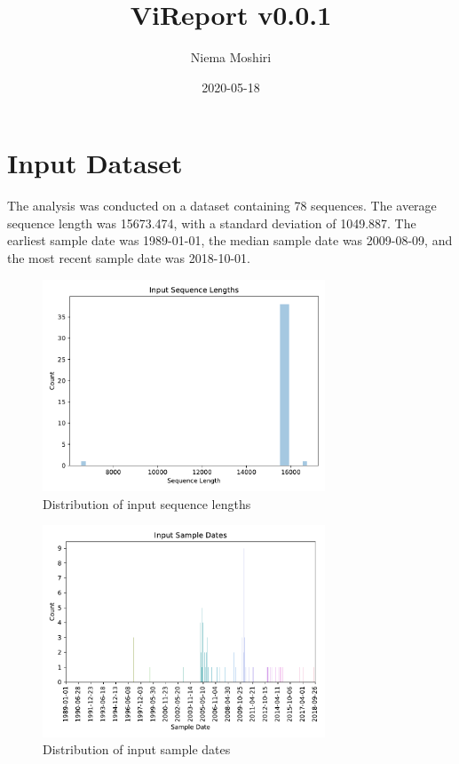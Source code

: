\documentclass{article}
\title{\vspace{-2.0cm}ViReport v0.0.1}
\author{Niema Moshiri}
\date{2020-05-18}
\begin{document}
\maketitle

\section{Input Dataset}
The analysis was conducted on a dataset containing 78 sequences. The average sequence length was 15673.474, with a standard deviation of 1049.887. The earliest sample date was 1989-01-01, the median sample date was 2009-08-09, and the most recent sample date was 2018-10-01.

\begin{figure}[h]
\centering
\includegraphics[width=0.75\textwidth,keepaspectratio]{./figs/input_sequence_lengths.pdf}
\caption{Distribution of input sequence lengths}
\end{figure}



\begin{figure}[h]
\centering
\includegraphics[width=0.75\textwidth,keepaspectratio]{./figs/input_sample_dates.pdf}
\caption{Distribution of input sample dates}
\end{figure}
\end{document}
